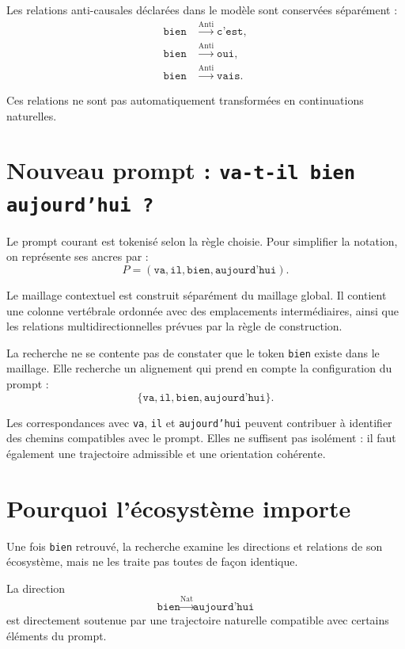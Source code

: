 \documentclass[11pt,a4paper]{report}
\theoremstyle{definition}
\theoremstyle{plain}
\theoremstyle{remark}
\begin{document}
Les relations anti-causales déclarées dans le modèle sont
conservées séparément :
\[
\begin{aligned}
\texttt{bien}
&\overset{\mathrm{Anti}}{\longrightarrow}\texttt{c'est},\\
\texttt{bien}
&\overset{\mathrm{Anti}}{\longrightarrow}\texttt{oui},\\
\texttt{bien}
&\overset{\mathrm{Anti}}{\longrightarrow}\texttt{vais}.
\end{aligned}
\]

Ces relations ne sont pas automatiquement transformées en
continuations naturelles.

\section{Nouveau prompt : \texttt{va-t-il bien aujourd'hui ?}}

Le prompt courant est tokenisé selon la règle choisie. Pour
simplifier la notation, on représente ses ancres par :
\[
P=(\texttt{va},\texttt{il},\texttt{bien},
\texttt{aujourd'hui}).
\]

Le maillage contextuel est construit séparément du maillage
global. Il contient une colonne vertébrale ordonnée avec des
emplacements intermédiaires, ainsi que les relations
multidirectionnelles prévues par la règle de construction.

La recherche ne se contente pas de constater que le token
\texttt{bien} existe dans le maillage. Elle recherche un
alignement qui prend en compte la configuration du prompt :
\[
\{\texttt{va},\texttt{il},\texttt{bien},
\texttt{aujourd'hui}\}.
\]

Les correspondances avec \texttt{va}, \texttt{il} et
\texttt{aujourd'hui} peuvent contribuer à identifier des chemins
compatibles avec le prompt. Elles ne suffisent pas isolément :
il faut également une trajectoire admissible et une orientation
cohérente.

\section{Pourquoi l'écosystème importe}

Une fois \texttt{bien} retrouvé, la recherche examine les
directions et relations de son écosystème, mais ne les traite
pas toutes de façon identique.

La direction
\[
\texttt{bien}
\overset{\mathrm{Nat}}{\longrightarrow}
\texttt{aujourd'hui}
\]
est directement soutenue par une trajectoire naturelle
compatible avec certains éléments du prompt.
\end{document}

